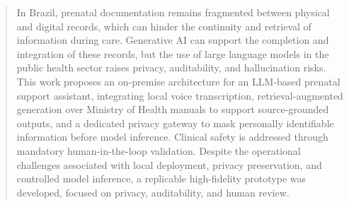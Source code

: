 \documentclass[sigconf]{webmedia}
\begin{document}
\begin{abstract}
  

  In Brazil, prenatal documentation remains fragmented between physical and digital records, which can hinder the continuity and retrieval of information during care. Generative AI can support the completion and integration of these records, but the use of large language models in the public health sector raises privacy, auditability, and hallucination risks. This work proposes an on-premise architecture for an LLM-based prenatal support assistant, integrating local voice transcription, retrieval-augmented generation over Ministry of Health manuals to support source-grounded outputs, and a dedicated privacy gateway to mask personally identifiable information before model inference. Clinical safety is addressed through mandatory human-in-the-loop validation. Despite the operational challenges associated with local deployment, privacy preservation, and controlled model inference, a replicable high-fidelity prototype was developed, focused on privacy, auditability, and human review.
\end{abstract}
\end{document}
